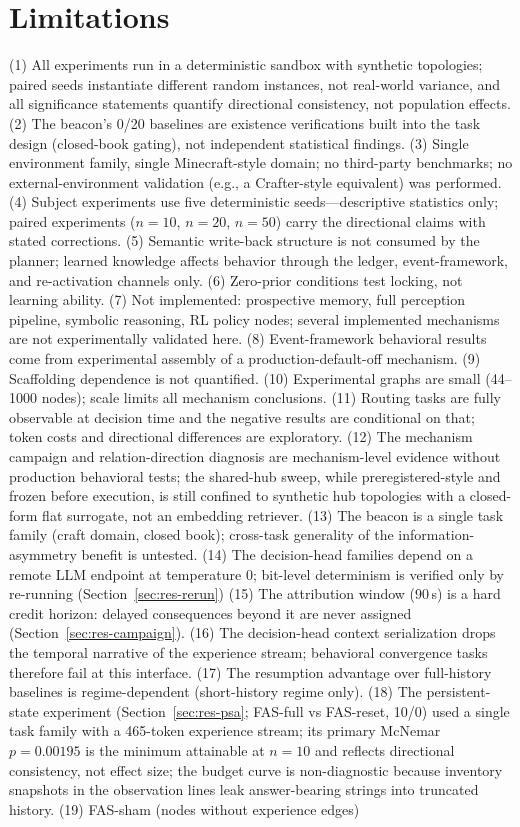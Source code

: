 \documentclass[10pt,a4paper]{article}
\begin{document}
\section{Limitations}
\label{sec:limits}
(1) All experiments run in a deterministic sandbox with synthetic topologies; paired seeds instantiate different random instances, not real-world variance, and all significance statements quantify directional consistency, not population effects. (2) The beacon's 0/20 baselines are existence verifications built into the task design (closed-book gating), not independent statistical findings. (3) Single environment family, single Minecraft-style domain; no third-party benchmarks; no external-environment validation (e.g., a Crafter-style equivalent) was performed. (4) Subject experiments use five deterministic seeds---descriptive statistics only; paired experiments ($n{=}10$, $n{=}20$, $n{=}50$) carry the directional claims with stated corrections. (5) Semantic write-back structure is not consumed by the planner; learned knowledge affects behavior through the ledger, event-framework, and re-activation channels only. (6) Zero-prior conditions test locking, not learning ability. (7) Not implemented: prospective memory, full perception pipeline, symbolic reasoning, RL policy nodes; several implemented mechanisms are not experimentally validated here. (8) Event-framework behavioral results come from experimental assembly of a production-default-off mechanism. (9) Scaffolding dependence is not quantified. (10) Experimental graphs are small (44--1000 nodes); scale limits all mechanism conclusions. (11) Routing tasks are fully observable at decision time and the negative results are conditional on that; token costs and directional differences are exploratory. (12) The mechanism campaign and relation-direction diagnosis are mechanism-level evidence without production behavioral tests; the shared-hub sweep, while preregistered-style and frozen before execution, is still confined to synthetic hub topologies with a closed-form flat surrogate, not an embedding retriever. (13) The beacon is a single task family (craft domain, closed book); cross-task generality of the information-asymmetry benefit is untested. (14) The decision-head families depend on a remote LLM endpoint at temperature 0; bit-level determinism is verified only by re-running (Section~\ref{sec:res-rerun}) (15) The attribution window (90\,s) is a hard credit horizon: delayed consequences beyond it are never assigned (Section~\ref{sec:res-campaign}). (16) The decision-head context serialization drops the temporal narrative of the experience stream; behavioral convergence tasks therefore fail at this interface. (17) The resumption advantage over full-history baselines is regime-dependent (short-history regime only). (18) The persistent-state experiment (Section~\ref{sec:res-psa}; FAS-full vs FAS-reset, 10/0) used a single task family with a 465-token experience stream; its primary McNemar $p{=}0.00195$ is the minimum attainable at $n{=}10$ and reflects directional consistency, not effect size; the budget curve is non-diagnostic because inventory snapshots in the observation lines leak answer-bearing strings into truncated history. (19) FAS-sham (nodes without experience edges) 
\end{document}

